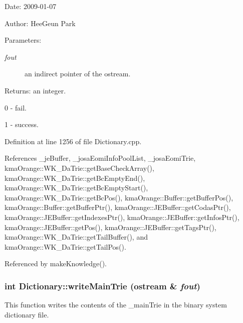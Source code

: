 \begin{Desc}
\item[Date:]2009-01-07 \end{Desc}
\begin{Desc}
\item[Author:]HeeGeun Park \end{Desc}
\begin{Desc}
\item[Parameters:]
\begin{description}
\item[{\em fout}]an indirect pointer of the ostream. \end{description}
\end{Desc}
\begin{Desc}
\item[Returns:]an integer.\par
 0 - fail.\par
 1 - success. \end{Desc}


Definition at line 1256 of file Dictionary.cpp.

References \_\-jeBuffer, \_\-josaEomiInfoPoolList, \_\-josaEomiTrie, kmaOrange::WK\_\-DaTrie::getBaseCheckArray(), kmaOrange::WK\_\-DaTrie::getBcEmptyEnd(), kmaOrange::WK\_\-DaTrie::getBcEmptyStart(), kmaOrange::WK\_\-DaTrie::getBcPos(), kmaOrange::Buffer::getBufferPos(), kmaOrange::Buffer::getBufferPtr(), kmaOrange::JEBuffer::getCodasPtr(), kmaOrange::JEBuffer::getIndexesPtr(), kmaOrange::JEBuffer::getInfosPtr(), kmaOrange::JEBuffer::getPos(), kmaOrange::JEBuffer::getTagsPtr(), kmaOrange::WK\_\-DaTrie::getTailBuffer(), and kmaOrange::WK\_\-DaTrie::getTailPos().

Referenced by makeKnowledge().\hypertarget{classkmaOrange_1_1Dictionary_220a21911afc35f3b4801afc1d589e94}{
\subsubsection[{writeMainTrie}]{\setlength{\rightskip}{0pt plus 5cm}int Dictionary::writeMainTrie (ostream \& {\em fout})}}
\label{classkmaOrange_1_1Dictionary_220a21911afc35f3b4801afc1d589e94}


This function writes the contents of the \_\-mainTrie in the binary system dictionary file. 

